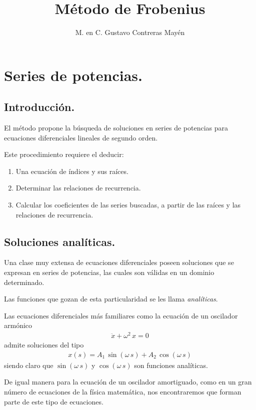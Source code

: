 
\title{Método de Frobenius} \vspace{-3ex}
\author{M. en C. Gustavo Contreras Mayén}
\date{ }
\newcommand{\Cancel}[2][black]{{\color{#1}\cancel{\color{black}#2}}}

\vspace{-4cm}
\maketitle
\fontsize{14}{14}\selectfont
\tableofcontents
\newpage

\section{Series de potencias.}
\subsection{Introducción.}

El método propone la búsqueda de soluciones en series de potencias para ecuaciones diferenciales lineales de segundo orden.
\par
Este procedimiento requiere el deducir:
\begin{enumerate}
\item Una ecuación de índices y sus raíces.
\item Determinar las relaciones de recurrencia.
\item Calcular los coeficientes de las series buscadas, a partir de las raíces y las relaciones de recurrencia.
\end{enumerate}

\subsection{Soluciones analíticas.}

Una clase muy extensa de ecuaciones diferenciales poseen soluciones que se expresan en series de potencias, las cuales son válidas en un dominio determinado.
\par
Las funciones que gozan de esta particularidad se les llama \emph{analíticas}.
\par
Las ecuaciones diferenciales más familiares como la ecuación de un oscilador armónico
\begin{align*}
\ddot{x} + \omega^{2} \, x = 0
\end{align*}
admite soluciones del tipo
\begin{align*}
x(s) = A_{1} \, \sin( \omega \, s) + A_{2} \, \cos (\omega \, s)
\end{align*}
siendo claro que $\sin( \omega \, s)$ y $\cos( \omega \, s)$ son funciones analíticas.
\par
De igual manera para la ecuación de un oscilador amortiguado, como en un gran número de ecuaciones de la física matemática, nos encontraremos que forman parte de este tipo de ecuaciones.

